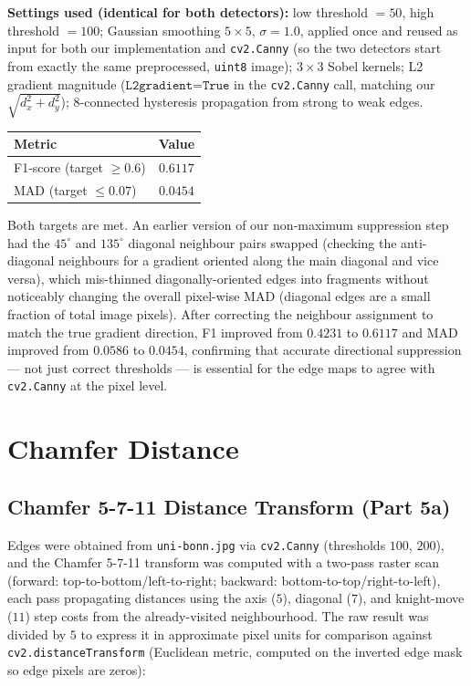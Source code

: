 \documentclass[11pt]{article}
\begin{document}
\textbf{Settings used (identical for both detectors):} low threshold $=50$, high threshold
$=100$; Gaussian smoothing $5\times5$, $\sigma=1.0$, applied once and reused as input for
both our implementation and \texttt{cv2.Canny} (so the two detectors start from exactly the
same preprocessed, \texttt{uint8} image); $3\times3$ Sobel kernels; L2 gradient magnitude
($\texttt{L2gradient=True}$ in the \texttt{cv2.Canny} call, matching our
$\sqrt{d_x^2+d_y^2}$); 8-connected hysteresis propagation from strong to weak edges.

\begin{center}
\begin{tabular}{lc}
\toprule
Metric & Value \\
\midrule
F1-score (target $\geq 0.6$) & $\mathbf{0.6117}$ \\
MAD (target $\leq 0.07$) & $\mathbf{0.0454}$ \\
\bottomrule
\end{tabular}
\end{center}

Both targets are met. An earlier version of our non-maximum suppression step had the $45^\circ$
and $135^\circ$ diagonal neighbour pairs swapped (checking the anti-diagonal neighbours for
a gradient oriented along the main diagonal and vice versa), which mis-thinned diagonally-oriented
edges into fragments without noticeably changing the overall pixel-wise MAD (diagonal edges are a
small fraction of total image pixels). After correcting the neighbour assignment to match the true
gradient direction, F1 improved from $0.4231$ to $0.6117$ and MAD improved from $0.0586$ to
$0.0454$, confirming that accurate directional suppression --- not just correct thresholds --- is
essential for the edge maps to agree with \texttt{cv2.Canny} at the pixel level.

\section{Chamfer Distance}

\subsection{Chamfer 5-7-11 Distance Transform (Part 5a)}

Edges were obtained from \texttt{uni-bonn.jpg} via \texttt{cv2.Canny} (thresholds $100$,
$200$), and the Chamfer 5-7-11 transform was computed with a two-pass raster scan (forward:
top-to-bottom/left-to-right; backward: bottom-to-top/right-to-left), each pass propagating
distances using the axis ($5$), diagonal ($7$), and knight-move ($11$) step costs from the
already-visited neighbourhood. The raw result was divided by $5$ to express it in
approximate pixel units for comparison against \texttt{cv2.distanceTransform} (Euclidean
metric, computed on the inverted edge mask so edge pixels are zeros):
\end{document}
